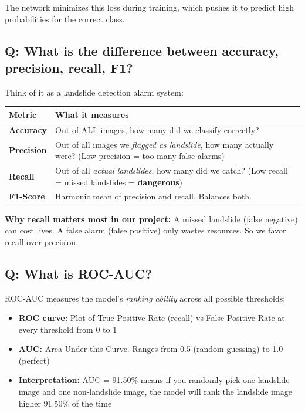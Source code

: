 \documentclass[11pt]{article}
\begin{document}
The network minimizes this loss during training, which pushes it to predict high probabilities for the correct class.

\subsection{Q: What is the difference between accuracy, precision, recall, F1?}

Think of it as a landslide detection alarm system:

\begin{table}[H]
    \centering
    \renewcommand{\arraystretch}{1.3}
    \begin{tabular}{lp{10cm}}
        \toprule
        \textbf{Metric} & \textbf{What it measures} \\
        \midrule
        \textbf{Accuracy} & Out of ALL images, how many did we classify correctly? \\
        \textbf{Precision} & Out of all images we \textit{flagged as landslide}, how many actually were? (Low precision = too many false alarms) \\
        \textbf{Recall} & Out of all \textit{actual landslides}, how many did we catch? (Low recall = missed landslides = \textbf{dangerous}) \\
        \textbf{F1-Score} & Harmonic mean of precision and recall. Balances both. \\
        \bottomrule
    \end{tabular}
\end{table}

\textbf{Why recall matters most in our project:} A missed landslide (false negative) can cost lives. A false alarm (false positive) only wastes resources. So we favor recall over precision.

\subsection{Q: What is ROC-AUC?}

ROC-AUC measures the model's \textit{ranking ability} across all possible thresholds:

\begin{itemize}[noitemsep]
    \item \textbf{ROC curve:} Plot of True Positive Rate (recall) vs False Positive Rate at every threshold from 0 to 1
    \item \textbf{AUC:} Area Under this Curve. Ranges from 0.5 (random guessing) to 1.0 (perfect)
    \item \textbf{Interpretation:} AUC = 91.50\% means if you randomly pick one landslide image and one non-landslide image, the model will rank the landslide image higher 91.50\% of the time
\end{itemize}
\end{document}
